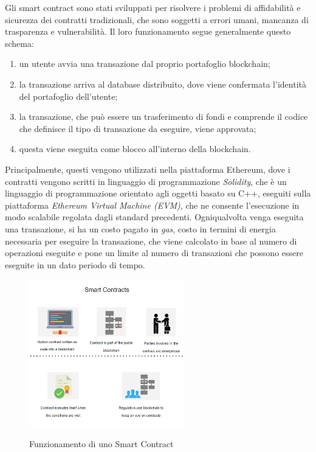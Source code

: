 Gli smart contract sono stati sviluppati per risolvere i problemi di affidabilità e sicurezza dei contratti tradizionali, che sono soggetti a errori umani, mancanza di trasparenza e vulnerabilità.
Il loro funzionamento segue generalmente questo schema:
\begin{enumerate}
    \item un utente avvia una transazione dal proprio portafoglio blockchain;
    \item la transazione arriva al database distribuito, dove viene confermata l'identità del portafoglio dell'utente;
    \item la transazione, che può essere un trasferimento di fondi e comprende il codice che definisce il tipo di transazione da eseguire, viene approvata;
    \item questa viene eseguita come blocco all'interno della blockchain.
\end{enumerate}

Principalmente, questi vengono utilizzati nella piattaforma Ethereum, dove i contratti vengono scritti in linguaggio di programmazione \textit{Solidity}, 
che è un linguaggio di programmazione orientato agli oggetti basato su C++,
eseguiti sulla piattaforma \textit{Ethereum Virtual Machine (EVM)}, che ne consente l'esecuzione in modo scalabile regolata dagli standard precedenti.
Ogniqualvolta venga eseguita una transazione, si ha un costo pagato in \textit{gas}, costo in termini di energia necessaria per eseguire la transazione, che viene calcolato in base al numero di operazioni eseguite
e pone un limite al numero di transazioni che possono essere eseguite in un dato periodo di tempo. \\

\begin{figure}[h]
    \centering
    \includegraphics[width=0.6\textwidth, alt={Come funziona uno Smart Contract}]{immagini/smart-contract.png}
    \caption{Funzionamento di uno Smart Contract}
\end{figure}


